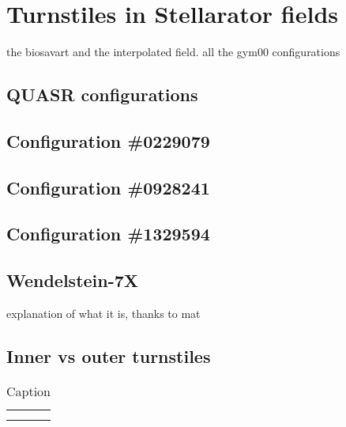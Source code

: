 

\chapter{Turnstiles in Stellarator fields}

the biosavart and the interpolated field. all the gym00 configurations

\section{QUASR configurations}

\section{Configuration \#0229079}

\section{Configuration \#0928241}

\section{Configuration \#1329594}

\section{Wendelstein-7X}
explanation of what it is, thanks to mat

\section{Inner vs outer turnstiles}

\begin{table}[]
    \centering
    \begin{tabular}{c|c}
         &  \\
         & 
    \end{tabular}
    \caption{Caption}
    \label{tab:my_label}
\end{table}